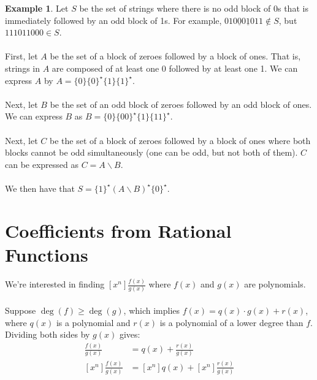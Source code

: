 \documentclass[]{article}
\theoremstyle{definition}
\newtheorem{ex}{Example}[section]
\newcommand{\lecture}[1]{\marginpar{{\footnotesize $\leftarrow$ \underline{#1}}}}
\begin{document}
				\begin{ex}
					Let $S$ be the set of strings where there is no odd block of 0s that is immediately followed by an odd block of 1s. For example, $01\underline{000}\underline{1}011 \not \in S$, but $111011000 \in S$.
					\\ \\
					First, let $A$ be the set of a block of zeroes followed by a block of ones. That is, strings in $A$ are composed of at least one 0 followed by at least one 1. We can express $A$ by $A = \{0\}\{0\}^\star\{1\}\{1\}^\star$.
					\\ \\
					Next, let $B$ be the set of an odd block of zeroes followed by an odd block of ones. We can express $B$ as $B = \{0\}\{00\}^\star\{1\}\{11\}^\star$.
					\\ \\
					Next, let $C$ be the set of a block of zeroes followed by a block of ones where both blocks cannot be odd simultaneously (one can be odd, but not both of them). $C$ can be expressed as $C = A \mathbin{\backslash} B$.
					\\ \\
					We then have that $S = \{1\}^\star(A \mathbin{\backslash} B)^\star \{0\}^\star$.

				\end{ex}
	
	\section{Coefficients from Rational Functions} \lecture{February 6, 2013}
		We're interested in finding $[x^n]\frac{f(x)}{g(x)}$ where $f(x)$ and $g(x)$ are polynomials.
		\\ \\
		Suppose $\deg(f) \ge \deg(g)$, which implies $f(x) = q(x) \cdot g(x) + r(x)$, where $q(x)$ is a polynomial and $r(x)$ is a polynomial of a lower degree than $f$. Dividing both sides by $g(x)$ gives:
		\begin{align*}
			\frac{f(x)}{g(x)} &= q(x) + \frac{r(x)}{g(x)} \\
			[x^n] \frac{f(x)}{g(x)} &= [x^n] q(x) + [x^n] \frac{r(x)}{g(x)}
		\end{align*}
\end{document}
